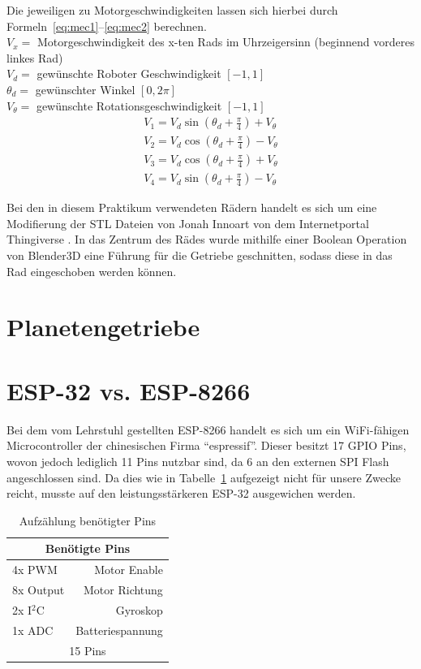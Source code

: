 Die jeweiligen zu Motorgeschwindigkeiten lassen sich hierbei durch Formeln~\ref{eq:mec1}--\ref{eq:mec2} berechnen.\\

$V_x =$ Motorgeschwindigkeit des x-ten Rads im Uhrzeigersinn (beginnend vorderes linkes Rad)\\
$V_d =$ gewünschte Roboter Geschwindigkeit $[-1, 1]$\\
$\theta_d =$ gewünschter Winkel $[0, 2\pi]$\\
$V_\theta =$ gewünschte Rotationsgeschwindigkeit $[-1, 1]$\\


\begin{align}
	V_1 = V_d\sin{(\theta_d+\frac{\pi}{4})} + V_\theta \label{eq:mec1}\\
	V_2 = V_d\cos{(\theta_d+\frac{\pi}{4})} - V_\theta\\
	V_3 = V_d\cos{(\theta_d+\frac{\pi}{4})} + V_\theta\\
	V_4 = V_d\sin{(\theta_d+\frac{\pi}{4})} - V_\theta \label{eq:mec2}
\end{align} 

Bei den in diesem Praktikum verwendeten Rädern handelt es sich um eine Modifierung der STL Dateien von Jonah Innoart von dem Internetportal Thingiverse \cite{link:mecanum44}. 
In das Zentrum des Rädes wurde mithilfe einer Boolean Operation von Blender3D eine Führung für die Getriebe geschnitten, sodass diese in das Rad eingeschoben werden können.

\section{Planetengetriebe}

\section{ESP-32 vs. ESP-8266}
Bei dem vom Lehrstuhl gestellten ESP-8266 handelt es sich um ein WiFi-fähigen Microcontroller der chinesischen Firma ``espressif''.
Dieser besitzt 17 GPIO Pins, wovon jedoch lediglich 11 Pins nutzbar sind, da 6 an den externen SPI Flash angeschlossen sind.
Da dies wie in Tabelle~\ref{table:pins} aufgezeigt nicht für unsere Zwecke reicht, musste auf den leistungsstärkeren ESP-32 ausgewichen werden.

\begin{table}[!ht]
\centering
\begin{tabular}{lr}
	\multicolumn{2}{c}{Benötigte Pins} \\ 
	\midrule[3pt] 
	4x PWM & Motor Enable \\ 
	\midrule 
	8x Output & Motor Richtung \\ 
	\midrule 
	2x I$^2$C & Gyroskop \\ 
	\midrule 
	1x ADC & Batteriespannung \\ 
	\midrule
	\midrule 
	\multicolumn{2}{c}{15 Pins} \\ 
	 
\end{tabular} 
\caption{Aufzählung benötigter Pins} 
\label{table:pins}
\end{table} 

